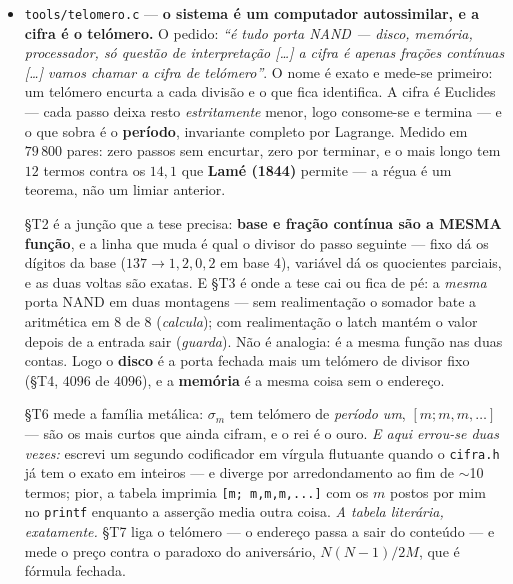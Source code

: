 \documentclass[11pt]{article}
\newcommand{\code}[1]{\texttt{\small #1}}
\theoremstyle{plain}
\theoremstyle{remark}
\begin{document}
\begin{itemize}
§G5 desempacota \code{Q4\_K} --- escala e mínimo de $16$ bits por super-bloco, oito pares de $6$ bits
por sub-bloco, $4$ bits por peso --- e mede a distribuição: média $-0{,}000167$, desvio $0{,}0206$,
zero não-finitos. §G6 atravessa os $940$~MiB inteiros e a RAM anónima cresce $+0$~kB: \emph{o modelo
é lido, não residido}. §G7 fecha o pedido --- \code{blk.0.attn\_q.weight} desempacotado do disco e
multiplicado, com a RAM parada.

\emph{E o medidor diz o que não prova.} As duas asserções de §G7 --- linearidade e $W\!\cdot\!e_j$ ---
apanham a máquina partir-se, não ela estar \emph{coerentemente} errada: o zero exato é zero porque
os dois caminhos partilham a mesma aritmética de bloco, e a linearidade vale para qualquer indexação
fixa, mesmo trocada. A correção assenta nos oráculos externos, e a prova que falta é uma só: o
forward completo comparado com a saída do próprio ollama.

\item \code{tools/telomero.c} --- \textbf{o sistema é um computador autossimilar, e a cifra é o
telómero.} O pedido: \emph{``é tudo porta NAND --- disco, memória, processador, só questão de
interpretação [\ldots] a cifra é apenas frações contínuas [\ldots] vamos chamar a cifra de
telómero''}. O nome é exato e mede-se primeiro: um telómero encurta a cada divisão e o que fica
identifica. A cifra é Euclides --- cada passo deixa resto \emph{estritamente} menor, logo consome-se
e termina --- e o que sobra é o \textbf{período}, invariante completo por Lagrange. Medido em
$79\,800$ pares: zero passos sem encurtar, zero por terminar, e o mais longo tem $12$ termos contra
os $14{,}1$ que \textbf{Lamé (1844)} permite --- a régua é um teorema, não um limiar anterior.

§T2 é a junção que a tese precisa: \textbf{base e fração contínua são a MESMA função}, e a linha que
muda é qual o divisor do passo seguinte --- fixo dá os dígitos da base ($137 \to 1{,}2{,}0{,}2$ em
base $4$), variável dá os quocientes parciais, e as duas voltas são exatas. E §T3 é onde a tese cai
ou fica de pé: a \emph{mesma} porta NAND em duas montagens --- sem realimentação o somador bate a
aritmética em $8$ de $8$ (\emph{calcula}); com realimentação o latch mantém o valor depois de a
entrada sair (\emph{guarda}). Não é analogia: é a mesma função nas duas contas. Logo o \textbf{disco}
é a porta fechada mais um telómero de divisor fixo (§T4, $4096$ de $4096$), e a \textbf{memória} é a
mesma coisa sem o endereço.

§T6 mede a família metálica: $\sigma_m$ tem telómero de \emph{período um}, $[m;m,m,\ldots]$ --- são
os mais curtos que ainda cifram, e o rei é o ouro. \emph{E aqui errou-se duas vezes:} escrevi um
segundo codificador em vírgula flutuante quando o \code{cifra.h} já tem o exato em inteiros --- e
diverge por arredondamento ao fim de $\sim$10 termos; pior, a tabela imprimia
\code{[m; m,m,m,...]} com os $m$ postos por mim no \code{printf} enquanto a asserção media outra
coisa. \emph{A tabela literária, exatamente.} §T7 liga o telómero --- o endereço passa a sair do
conteúdo --- e mede o preço contra o paradoxo do aniversário, $N(N{-}1)/2M$, que é fórmula fechada.


\end{itemize}
\end{document}
